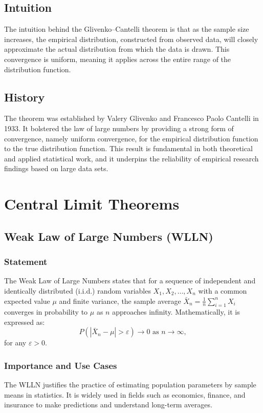 \documentclass{article}
\begin{document}
\subsection{Intuition}
The intuition behind the Glivenko–Cantelli theorem is that as the sample size increases, the empirical distribution, constructed from observed data, will closely approximate the actual distribution from which the data is drawn. This convergence is uniform, meaning it applies across the entire range of the distribution function.

\subsection{History}
The theorem was established by Valery Glivenko and Francesco Paolo Cantelli in 1933. It bolstered the law of large numbers by providing a strong form of convergence, namely uniform convergence, for the empirical distribution function to the true distribution function. This result is fundamental in both theoretical and applied statistical work, and it underpins the reliability of empirical research findings based on large data sets.


\section{Central Limit Theorems}
\subsection{Weak Law of Large Numbers (WLLN)}

\subsubsection{Statement}
The Weak Law of Large Numbers states that for a sequence of independent and identically distributed (i.i.d.) random variables \( X_1, X_2, \ldots, X_n \) with a common expected value \( \mu \) and finite variance, the sample average \( \bar{X}_n = \frac{1}{n}\sum_{i=1}^{n}X_i \) converges in probability to \( \mu \) as \( n \) approaches infinity. Mathematically, it is expressed as:
\[ P\left(\left|\bar{X}_n - \mu\right| > \varepsilon\right) \rightarrow 0 \text{ as } n \rightarrow \infty, \]
for any \( \varepsilon > 0 \). 

\subsubsection{Importance and Use Cases}
The WLLN justifies the practice of estimating population parameters by sample means in statistics. It is widely used in fields such as economics, finance, and insurance to make predictions and understand long-term averages.
\end{document}
